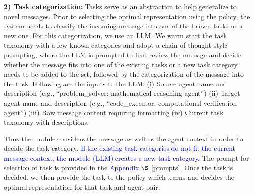 \noindent \textbf{2) Task categorization:}
Tasks serve as an abstraction to help generalize to novel messages. Prior to selecting the optimal representation using the policy, the system needs to classify the incoming message into one of the known tasks or a new one. For this categorization, we use an LLM. We warm start the task taxonomy with a few known categories and adopt a chain of thought style prompting, where the LLM is prompted to first review the message and decide whether the message fits into one of the existing tasks or a new task category needs to be added to the set, followed by the categorization of the message into the task. Following are the inputs to the LLM:
(i) Source agent name and description (e.g., ``problem\_solver: mathematical reasoning agent'')
(ii) Target agent name and description (e.g., ``code\_executor: computational verification agent'') 
(iii) Raw message content requiring formatting
(iv) Current task taxonomy with descriptions.

Thus the module considers the message as well as the agent context in order to decide the task category. 
\textcolor{blue}{If the existing task categories do not fit the current message context, the module (LLM) creates a new task category.}
The prompt for selection of task is provided in the \textcolor{blue}{Appendix $\S$ \ref{prompts}}. Once the task is decided, we then provide the task to the policy which learns and decides the optimal representation for that task and agent pair.


